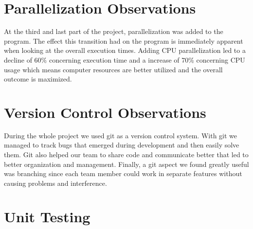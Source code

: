 \documentclass{ws-ijprai}
\begin{document}
\section{Parallelization Observations}
\tab At the third and last part of the project, parallelization was added to the program. The effect this transition had on the program is immediately apparent when looking at the overall execution times. Adding CPU parallelization led to a decline of 60\% concerning execution time and a increase of 70\% concerning CPU usage which means computer resources are better utilized and the overall outcome is maximized.

\section{Version Control Observations}
\tab During the whole project we used git as a version control system. With git we managed to track bugs that emerged during development and then easily solve them. Git also helped our team to share code and communicate better that led to better organization and management. Finally, a git aspect we found greatly useful was branching since each team member could work in separate features without causing problems and interference.

\clearpage
\section{Unit Testing}
\end{document}
